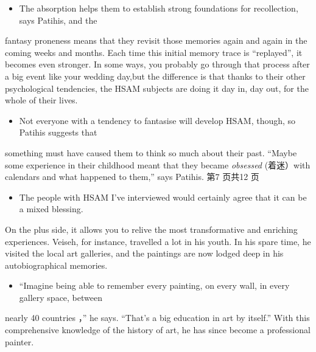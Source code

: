 \documentclass[UTF8,11pt]{ctexart}
\begin{document}
\begin{itemize}[leftmargin=2em,itemsep=.2em,topsep=.4em]\item[J.] The absorption helps them to establish strong foundations for recollection, says Patihis, and the
\end{itemize}

fantasy proneness means that they revisit those memories again and again in the coming weeks and months. Each time this initial memory trace is “replayed”, it becomes even stronger. In some ways, you probably go through that process after a big event like your wedding day,but the difference is that thanks to their other psychological tendencies, the HSAM subjects are doing it day in, day out, for the whole of their lives.


\begin{itemize}[leftmargin=2em,itemsep=.2em,topsep=.4em]\item[K.] Not everyone with a tendency to fantasise will develop HSAM, though, so Patihis suggests that
\end{itemize}

something must have caused them to think so much about their past. “Maybe some experience in their childhood meant that they became\textit{ obsessed} (着迷）with calendars and what happened to them,” says Patihis. 第7 页共12 页


\begin{itemize}[leftmargin=2em,itemsep=.2em,topsep=.4em]\item[L.] The people with HSAM I’ve interviewed would certainly agree that it can be a mixed blessing.
\end{itemize}

On the plus side, it allows you to relive the most transformative and enriching experiences. Veiseh, for instance, travelled a lot in his youth. In his spare time, he visited the local art galleries, and the paintings are now lodged deep in his autobiographical memories.


\begin{itemize}[leftmargin=2em,itemsep=.2em,topsep=.4em]\item[M.] “Imagine being able to remember every painting, on every wall, in every gallery space, between
\end{itemize}

nearly 40 countries ，” he says. “That’s a big education in art by itself.” With this comprehensive knowledge of the history of art, he has since become a professional painter.
\end{document}
